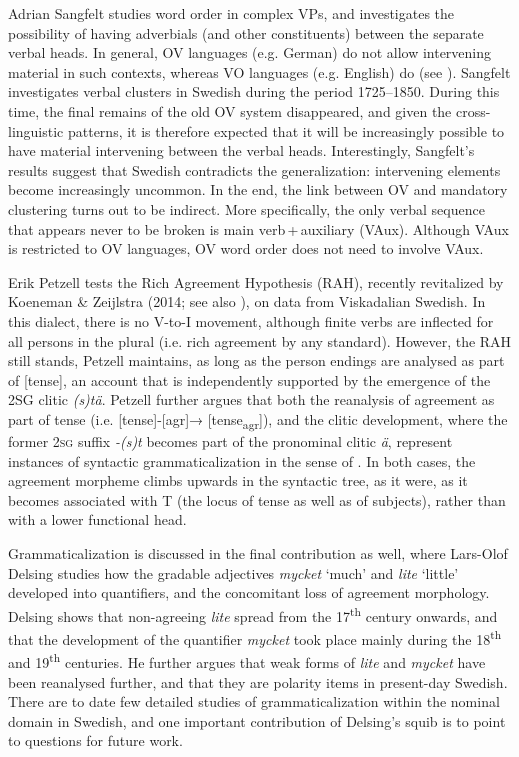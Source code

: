 \documentclass[output=paper]{langscibook}
\begin{document}
Adrian Sangfelt studies word order in complex VPs, and investigates the possibility of having adverbials (and other constituents) between the separate verbal heads. In general, OV languages (e.g. German) do not allow intervening material in such contexts, whereas VO languages (e.g. English) do (see \citealt{Haider2010,Haider2013}). Sangfelt investigates verbal clusters in Swedish during the period 1725–1850. During this time, the final remains of the old OV system disappeared, and given the cross-linguistic patterns, it is therefore expected that it will be increasingly possible to have material intervening between the verbal heads. Interestingly, Sangfelt’s results suggest that Swedish contradicts the generalization: intervening elements become increasingly uncommon. In the end, the link between OV and mandatory clustering turns out to be indirect. More specifically, the only verbal sequence that appears never to be broken is main verb\,+\,auxiliary (VAux). Although VAux is restricted to OV languages, OV word order does not need to involve VAux.



Erik Petzell tests the Rich Agreement Hypothesis (RAH), recently revitalized by Koeneman \& Zeijlstra (2014; see also \citealt{Tvica2017}), on data from Viskadalian Swedish. In this dialect, there is no V-to-I movement, although finite verbs are inflected for all persons in the plural (i.e. rich agreement by any standard). However, the RAH still stands, Petzell maintains, as long as the person endings are analysed as part of [tense], an account that is independently supported by the emergence of the 2SG clitic \textit{(s)tä}. Petzell further argues that both the reanalysis of agreement as part of tense (i.e. [tense]-[agr]→ [tense\textsubscript{agr}]), and the clitic development, where the former \textsc{2sg} suffix \textit{{}-(s)t} becomes part of the pronominal clitic \textit{ä}, represent instances of syntactic grammaticalization in the sense of \citet{RobertsRoussou1999, RobertsRoussou2003}. In both cases, the agreement morpheme climbs upwards in the syntactic tree, as it were, as it becomes associated with T (the locus of tense as well as of subjects), rather than with a lower functional head.



Grammaticalization is discussed in the final contribution as well, where Lars-Olof Delsing studies how the gradable adjectives \textit{mycket} ‘much’ and \textit{lite} ‘little’ developed into quantifiers, and the concomitant loss of agreement morphology. Delsing shows that non-agreeing \textit{lite} spread from the 17\textsuperscript{th} century onwards, and that the development of the quantifier \textit{mycket} took place mainly during the 18\textsuperscript{th} and 19\textsuperscript{th} centuries. He further argues that weak forms of \textit{lite} and \textit{mycket} have been reanalysed further, and that they are polarity items in present-day Swedish. There are to date few detailed studies of grammaticalization within the nominal domain in Swedish, and one important contribution of Delsing’s squib is to point to questions for future work.
\end{document}
